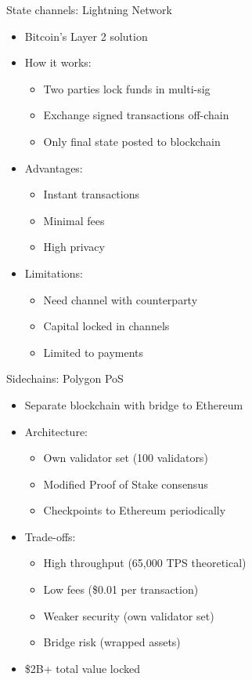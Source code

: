 \documentclass[aspectratio=169, lualatex, handout]{beamer}
\begin{document}
\begin{frame}{State channels: Lightning Network}
	\begin{itemize}
		\item Bitcoin's Layer 2 solution
		\item How it works:
		      \begin{itemize}
			      \item Two parties lock funds in multi-sig
			      \item Exchange signed transactions off-chain
			      \item Only final state posted to blockchain
		      \end{itemize}
		\item Advantages:
		      \begin{itemize}
			      \item Instant transactions
			      \item Minimal fees
			      \item High privacy
		      \end{itemize}
		\item Limitations:
		      \begin{itemize}
			      \item Need channel with counterparty
			      \item Capital locked in channels
			      \item Limited to payments
		      \end{itemize}
	\end{itemize}
\end{frame}

\begin{frame}{Sidechains: Polygon PoS}
	\begin{itemize}
		\item Separate blockchain with bridge to Ethereum
		\item Architecture:
		      \begin{itemize}
			      \item Own validator set (100 validators)
			      \item Modified Proof of Stake consensus
			      \item Checkpoints to Ethereum periodically
		      \end{itemize}
		\item Trade-offs:
		      \begin{itemize}
			      \item[\mycheckmark] High throughput (65,000 TPS theoretical)
			      \item[\mycheckmark] Low fees (\approx\$0.01 per transaction)
			      \item[\times] Weaker security (own validator set)
			      \item[\times] Bridge risk (wrapped assets)
		      \end{itemize}
		\item \$2B+ total value locked
	\end{itemize}
\end{frame}
\end{document}
